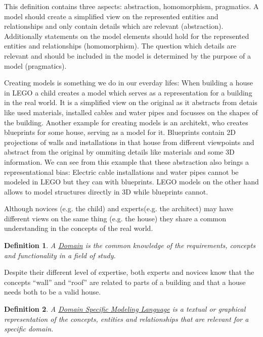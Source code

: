\documentclass[runningheads,a4paper]{llncs}
\newtheorem{defn}{Definition}
\begin{document}
  This definition contains three aspects: abstraction, homomorphism, pragmatics.
  A model should create a simplified view on the represented entities and relationships and 
  only contain details which are relevant (abstraction).
  Additionally statements on the model elements should hold for the represented entities and relationships (homomorphism).
  The question which details are relevant and should be included in the model is determined by the purpose of a model (pragmatics).  
 
  Creating models is something we do in our everday lifes:
  When building a house in LEGO a child creates a model which serves as a representation for a building in the real world.
  It is a simplified view on the original as it abstracts from detais like used materials, installed cables and water pipes and focusses
  on the shapes of the building.
  Another example for creating models is an architekt, who creates blueprints for some house, serving as a model for it.
  Blueprints contain 2D projections of walls and installations in that house from different viewpoints and abstract from the original by ommiting
  details like materials and some 3D information. 
  We can see from this example that these abstraction also brings a representational bias:
  Electric cable installations and water pipes cannot be modeled in LEGO but they can with blueprints.
  LEGO models on the other hand allows to model structures directly in 3D while blueprints cannot.
  
  Although novices (e.g. the child) and experts(e.g. the architect) may have different views on the same thing (e.g. the house)
  they share a common understanding in the concepts of the real world.  
  \begin{defn}
    \label{def:domain}
    A \underline{Domain} is the common knowledge of the requirements, concepts and functionality in a field of study.
  \end{defn}
  Despite their different level of expertise, both experts and novices know that the concepts ``wall'' and ``roof'' are 
  related to parts of a building and that a house needs both to be a valid house.
  \begin{defn}
    \label{def:domainspecificmodelinglanguage}
    A \underline{Domain Specific Modeling Language} is a textual or graphical representation 
    of the concepts, entities and relationships that are relevant for a specific domain.
  \end{defn}
\end{document}
